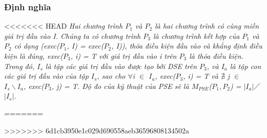 \subsubsection{Định nghĩa}
	
<<<<<<< HEAD
\textit{Hai chương trình $P_{1}$ và $P_{2}$ là hai chương trình có cùng miền giá trị đầu vào I. Chúng ta có chương trình $P_{3}$ là chương trình kết hợp của $P_{1}$ và $P_{2}$ có dạng (exec($P_{1}$, I) = exec($P_{2}$, I)), thõa điều kiện đầu vào và khẳng định điều kiện là đúng, exec($P_{3}$, i) = T với giá trị đầu vào i trên $P_{3}$ là thõa điều kiện. Trong đó, $I_{s}$ là tập các giá trị đầu vào được tạo bởi DSE trên $P_{3}$, và  $I_{a}$ là tập con các giá trị đầu vào của tập $I_{s}$, sao cho $\forall$i $\in$ $I_{a}$, exec($P_{3}$, i) = T và $\nexists $ j $\in$ $I_{s} \backslash I_{a}$, exec($P_{3}$, j) = T. Độ đo của kỹ thuật của PSE sẽ là $M_{PSE}$($P_{1},P_{2}$) = $\left|I_{a}\right|$$\diagup$$\left|I_{s}\right|$.}
	
=======


>>>>>>> 6d1cb3950e1c029d690558aeb36596808134502a
